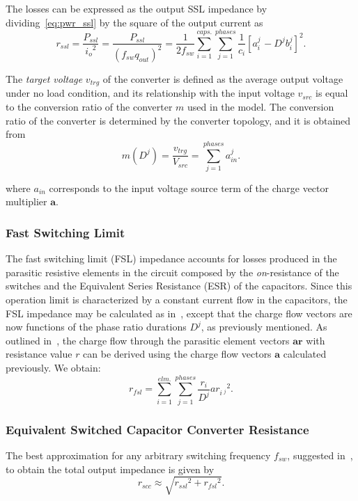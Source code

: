 The losses can be expressed as the output SSL impedance by dividing~\ref{eq:pwr_ssl} by the
square of the output current as
\begin{equation}
r_{ssl}=\frac{P_{ssl}}{{i_o}^2}=\frac{P_{ssl}}{{(f_{sw} {q_{out}})}^2}=\frac{1}{2 f_{sw}}\sum_{i=1}^{caps.}\sum_{j=1}^{phases}\frac{1}{c_i}{\left[a_{i\
}^j-{D^j} {b_i^j}\right]}^2.
\label{eq:r_ssl}
\end{equation}

The \textit{target voltage }$v_{trg}$ of the converter is defined as the average output voltage under no load condition, and its relationship with the input voltage $v_{src}$ is equal to the conversion ratio of the converter $m$ used in the model. The conversion ratio of the converter is determined by the converter topology, and it is obtained from
\begin{equation}
m(D^j)=\frac{{v_{trg}}}{V_{src}}=\sum_{j=1}^{phases}a_{in}^j.
\label{eq:r_ssl}
\end{equation}

where $a_{in}$  corresponds to the input voltage source term of the charge
vector multiplier $\mathbf{a}$.

\subsubsection[FSL]{Fast Switching Limit}
The fast switching limit (FSL) impedance accounts for losses produced in the parasitic resistive elements in the circuit composed by the \emph{on}-resistance of the switches and the Equivalent Series Resistance (ESR) of the capacitors. Since this operation limit is characterized by a constant current flow in the capacitors, the FSL impedance may be calculated as in~\cite{Seeman:EECS-2009-78}, except that the charge flow vectors are now functions of the phase ratio durations $D^j$, as previously mentioned. As outlined in~\cite{Seeman:EECS-2009-78}, the charge flow through the parasitic element vectors $\mathbf{ar}$ with resistance value $r$ can be derived using the charge flow vectors $\mathbf{a}$ calculated previously. We obtain:
\begin{equation}
r_{fsl}=\sum_{i=1}^{elm.}\sum_{j=1}^{phases}\frac{r_i}{D^j}{{ar}_{i\ ^j}}^2.
\label{eq:r_ssl}
\end{equation}

\subsubsection{Equivalent Switched Capacitor Converter Resistance}
The best approximation for any arbitrary switching frequency $f_{sw}$, suggested in~\cite{1998Arntzen,1999Maksimovic}, to obtain the total output impedance is given by
\begin{equation}
r_{scc} \approx \sqrt{{r_{ssl}}^2+{r_{fsl}}^2}.
\label{eq:r_scc}
\end{equation}

